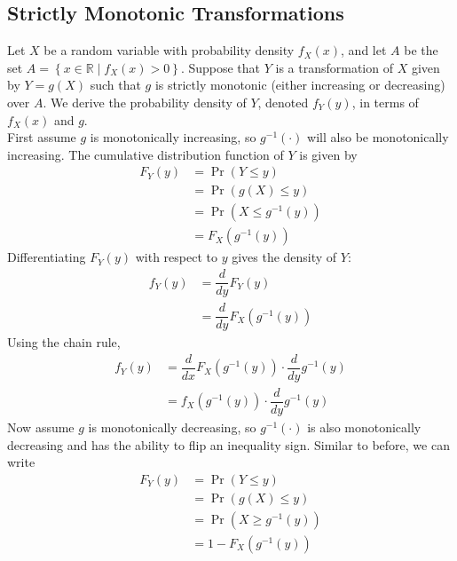 \documentclass[11pt]{report} %
\begin{document}
\subsection{Strictly Monotonic Transformations}

Let $X$ be a random variable with probability density $f_{X}\left(x\right)$, and let $A$ be the set $A = \left\{x \in\mathbb{R}\middle| f_{X}\left(x\right) > 0\right\}$. Suppose that $Y$ is a transformation of $X$ given by $Y = g\left(X\right)$ such that $g$ is strictly monotonic (either increasing or decreasing) over $A$. We derive the probability density of $Y$, denoted $f_{Y}\left(y\right)$, in terms of $f_{X}\left(x\right)$ and $g$. \\

First assume $g$ is monotonically increasing, so $g^{-1}\left(\cdot\right)$ will also be monotonically increasing. The cumulative distribution function of $Y$ is given by
\begin{align}
F_{Y}\left(y\right) &= \operatorname{Pr}\left(Y \leq y\right) \\
&= \operatorname{Pr}\left(g\left(X\right) \leq y\right) \\
&= \operatorname{Pr}\left(X \leq g^{-1}\left(y\right)\right) \\
&= F_{X}\left(g^{-1}\left(y\right)\right)
\end{align}
Differentiating $F_{Y}\left(y\right)$ with respect to $y$ gives the density of $Y$:
\begin{align}
f_{Y}\left(y\right) &= \dfrac{d}{dy}F_{Y}\left(y\right)\\
&= \dfrac{d}{dy}F_{X}\left(g^{-1}\left(y\right)\right)
\end{align}
Using the chain rule,
\begin{align}
f_{Y}\left(y\right) &= \dfrac{d}{dx}F_{X}\left(g^{-1}\left(y\right)\right)\cdot\dfrac{d}{dy}g^{-1}\left(y\right) \\
&= f_{X}\left(g^{-1}\left(y\right)\right)\cdot\dfrac{d}{dy}g^{-1}\left(y\right)
\end{align}
Now assume $g$ is monotonically decreasing, so $g^{-1}\left(\cdot\right)$ is also monotonically decreasing and has the ability to flip an inequality sign. Similar to before, we can write
\begin{align}
F_{Y}\left(y\right) &= \operatorname{Pr}\left(Y \leq y\right) \\
&= \operatorname{Pr}\left(g\left(X\right) \leq y\right) \\
&= \operatorname{Pr}\left(X \geq g^{-1}\left(y\right)\right) \\
&= 1 - F_{X}\left(g^{-1}\left(y\right)\right)
\end{align}
\end{document}
